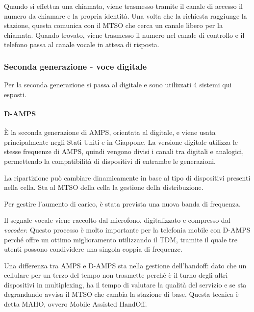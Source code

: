 Quando si effettua una chiamata, viene trasmesso tramite il canale di accesso il numero da chiamare e la propria identità.
Una volta che la richiesta raggiunge la stazione, questa comunica con il MTSO che cerca un canale libero per la chiamata.
Quando trovato, viene trasmesso il numero nel canale di controllo e il telefono passa al canale vocale in attesa di risposta.

\subsubsection{Seconda generazione - voce digitale}
Per la seconda generazione si passa al digitale e sono utilizzati 4 sistemi qui esposti.

\paragraph{D-AMPS}
\`E la seconda generazione di AMPS, orientata al digitale, e viene usata principalmente negli Stati Uniti e in Giappone.
La versione digitale utilizza le stesse frequenze di AMPS, quindi vengono divisi i canali tra digitali e analogici, permettendo la compatibilità di dispositivi di entrambe le generazioni.

La ripartizione può cambiare dinamicamente in base al tipo di dispositivi presenti nella cella. 
Sta al MTSO della cella la gestione della distribuzione.

Per gestire l'aumento di carico, è stata prevista una nuova banda di frequenza. 

Il segnale vocale viene raccolto dal microfono, digitalizzato e compresso dal \textit{vocoder}.
Questo processo è molto importante per la telefonia mobile con D-AMPS perché offre un ottimo miglioramento utilizzando il TDM,
tramite il quale tre utenti possono condividere una singola coppia di frequenze. 

Una differenza tra AMPS e D-AMPS sta nella gestione dell'handoff: 
dato che un cellulare per un terzo del tempo non trasmette perché è il turno degli altri dispositivi in multiplexing, 
ha il tempo di valutare la qualità del servizio e se sta degrandando avvisa il MTSO che cambia la stazione di base.
Questa tecnica è detta MAHO, ovvero Mobile Assisted HandOff.

